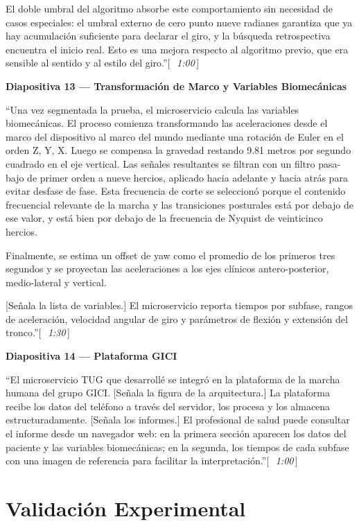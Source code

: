 \documentclass[12pt]{article}
\newcommand{\diap}[2]{%
  \begin{slidebox}
    \textbf{\color{slateblue}Diapositiva #1 — #2}
  \end{slidebox}%
}
\newcommand{\tiempo}[1]{\hfill{\small\color{timebox}[\,\textit{~#1}\,]}}
\begin{document}
El doble umbral del algoritmo absorbe este comportamiento sin necesidad de casos especiales: el umbral externo de cero punto nueve radianes garantiza que ya hay acumulación suficiente para declarar el giro, y la búsqueda retrospectiva encuentra el inicio real. Esto es una mejora respecto al algoritmo previo, que era sensible al sentido y al estilo del giro.''\tiempo{1:00}

\diap{13}{Transformación de Marco y Variables Biomecánicas}

``Una vez segmentada la prueba, el microservicio calcula las variables biomecánicas. El proceso comienza transformando las aceleraciones desde el marco del dispositivo al marco del mundo mediante una rotación de Euler en el orden Z, Y, X. Luego se compensa la gravedad restando 9.81 metros por segundo cuadrado en el eje vertical. Las señales resultantes se filtran con un filtro pasa-bajo de primer orden a nueve hercios, aplicado hacia adelante y hacia atrás para evitar desfase de fase. Esta frecuencia de corte se seleccionó porque el contenido frecuencial relevante de la marcha y las transiciones posturales está por debajo de ese valor, y está bien por debajo de la frecuencia de Nyquist de veinticinco hercios.

Finalmente, se estima un offset de yaw como el promedio de los primeros tres segundos y se proyectan las aceleraciones a los ejes clínicos antero-posterior, medio-lateral y vertical.

[Señala la lista de variables.] El microservicio reporta tiempos por subfase, rangos de aceleración, velocidad angular de giro y parámetros de flexión y extensión del tronco.''\tiempo{1:30}

\diap{14}{Plataforma GICI}

``El microservicio TUG que desarrollé se integró en la plataforma de la marcha humana del grupo GICI. [Señala la figura de la arquitectura.] La plataforma recibe los datos del teléfono a través del servidor, los procesa y los almacena estructuradamente. [Señala los informes.] El profesional de salud puede consultar el informe desde un navegador web: en la primera sección aparecen los datos del paciente y las variables biomecánicas; en la segunda, los tiempos de cada subfase con una imagen de referencia para facilitar la interpretación.''\tiempo{1:00}

\section{Validación Experimental}
\end{document}
